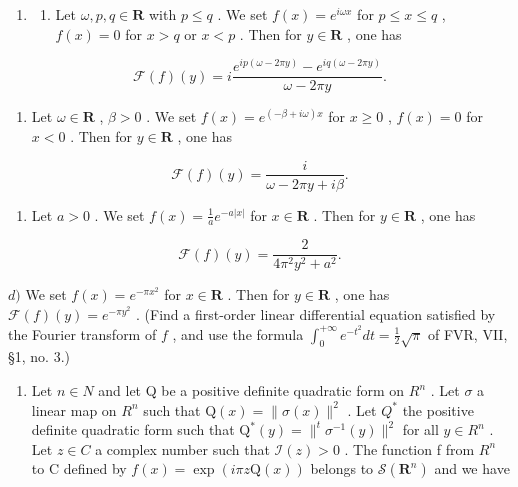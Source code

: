 
\begin{enumerate}
\def\labelenumi{\arabic{enumi})}
\tightlist
\item
  \begin{enumerate}
  \def\labelenumii{\alph{enumii})}
  \tightlist
  \item
    Let \(\omega, p, q \in \mathbf{R}\) with \(p \leqslant q\) . We set \(f(x) = e^{i\omega x}\) for \(p \leqslant x \leqslant q\) , \(f(x) = 0\) for \(x > q\) or \(x < p\) . Then for \(y \in \mathbf{R}\) , one has
  \end{enumerate}
\end{enumerate}

\[
\mathcal {F} (f) (y) = i \frac {e ^ {i p (\omega - 2 \pi y)} - e ^ {i q (\omega - 2 \pi y)}}{\omega - 2 \pi y}.
\]

\begin{enumerate}
\def\labelenumi{\alph{enumi})}
\setcounter{enumi}{1}
\tightlist
\item
  Let \(\omega \in \mathbf{R}\) , \(\beta > 0\) . We set \(f(x) = e^{(-\beta + i\omega)x}\) for \(x \geqslant 0\) , \(f(x) = 0\) for \(x < 0\) . Then for \(y \in \mathbf{R}\) , one has
\end{enumerate}

\[
\mathcal {F} (f) (y) = \frac {i}{\omega - 2 \pi y + i \beta}.
\]

\begin{enumerate}
\def\labelenumi{\alph{enumi})}
\setcounter{enumi}{2}
\tightlist
\item
  Let \(a > 0\) . We set \(f(x) = \frac{1}{a} e^{-a|x|}\) for \(x \in \mathbf{R}\) . Then for \(y \in \mathbf{R}\) , one has
\end{enumerate}

\[
\mathcal {F} (f) (y) = \frac {2}{4 \pi^ {2} y ^ {2} + a ^ {2}}.
\]

\(d)\) We set \(f(x) = e^{-\pi x^2}\) for \(x \in \mathbf{R}\) . Then for \(y \in \mathbf{R}\) , one has \(\mathcal{F}(f)(y) = e^{-\pi y^2}\) . (Find a first-order linear differential equation satisfied by the Fourier transform of \(f\) , and use the formula \(\int_0^{+\infty} e^{-t^2} dt = \frac{1}{2} \sqrt{\pi}\) of FVR, VII, §1, no. 3.)

\begin{enumerate}
\def\labelenumi{\alph{enumi})}
\setcounter{enumi}{4}
\tightlist
\item
  Let \(n \in N\) and let Q be a positive definite quadratic form on \(R^{n}\) . Let \(\sigma\) a linear map on \(R^{n}\) such that \(\mathrm{Q}(x) = \| \sigma(x) \|^{2}\) . Let \(Q^{*}\) the positive definite quadratic form such that \(\mathrm{Q}^{*}(y) = \|^{t} \sigma^{-1}(y) \|^{2}\) for all \(y \in R^{n}\) . Let \(z \in C\) a complex number such that \(\mathcal{I}(z) > 0\) . The function f from \(R^{n}\) to C defined by \(f(x) = \exp(i\pi z\mathrm{Q}(x))\) belongs to \(\mathcal{S}(\mathbf{R}^{n})\) and we have
\end{enumerate}

